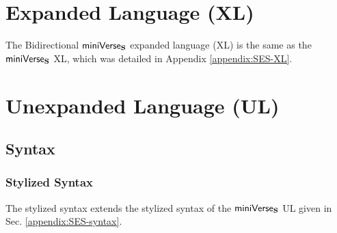 \section{Expanded Language (XL)}
The Bidirectional $\mathsf{miniVerse}_\textbf{S}$ expanded language (XL) is the same as the  $\mathsf{miniVerse}_\textbf{S}$ XL, which was detailed in Appendix \ref{appendix:SES-XL}. %

\section{Unexpanded Language (UL)}
\subsection{Syntax}
\subsubsection{Stylized Syntax}
The stylized syntax extends the stylized syntax of the $\mathsf{miniVerse}_\textbf{S}$ UL given in Sec. \ref{appendix:SES-syntax}.

